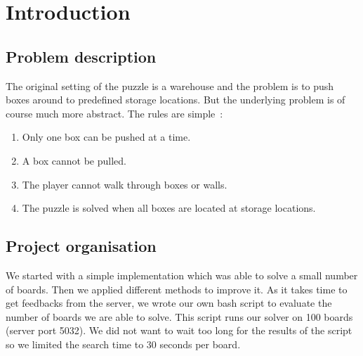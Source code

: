 \documentclass[a4paper,10pt]{article}
\begin{document}
\cleardoublepage
\tableofcontents
\newpage


\section{Introduction}
	\subsection{Problem description}
    The original setting of the puzzle is a warehouse and the problem is to push boxes
    around to predefined storage locations.  
    But the underlying problem is of course much more abstract.  The rules are simple~\cite{wiki_soko}: 
    \begin{enumerate}[I]
        \item  Only one box can be pushed at a time.
        \item A box cannot be pulled.
        \item The player cannot walk through boxes or walls.
        \item The puzzle is solved when all boxes are located at storage locations.
    \end{enumerate}
    
    \subsection{Project organisation}
	We started with a simple implementation which was able to solve a small number of boards. 
	Then we applied different methods to improve it.
	As it takes time to get feedbacks from the server, we wrote our own bash script to evaluate the number of boards we are able to solve.
	This script runs our solver on 100 boards (server port 5032).
	We did not want to wait too long for the results of the script so we limited the search time to 30 seconds per board.
\end{document}
